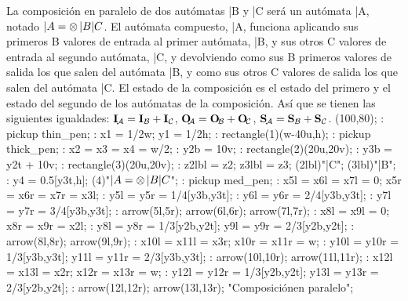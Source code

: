 La composición en paralelo de dos autómatas |B y |C será un
autómata |A, notado $|A = \prl |B |C$.  El autómata compuesto, |A,
funciona aplicando sus primeros \inp B valores de entrada al primer
autómata, |B, y sus otros \inp C valores de entrada al segundo
autómata, |C, y devolviendo como sus \out B primeros valores de salida
los que salen del autómata |B, y como sus otros \out C valores de salida
los que salen del autómata |C.  El estado de la composición es el
estado del primero y el estado del segundo de los autómatas de la
composición.  Así que se tienen las siguientes igualdades:
 $\inpA = \inp B + \inp C$, $\outA = \out B + \out C$,
 $\stA = \st B + \st C$.
\MTbeginfigure(100,80);
 \MT: pickup thin_pen;
 \MT: x1 = 1/2w; y1 = 1/2h;
 \MT: rectangle(1)(w-40u,h); %
 \MT: pickup thick_pen;
 \MT: x2 = x3 = x4 = w/2;
 \MT: y2b = 10v;
 \MT: rectangle(2)(20u,20v); %
 \MT: y3b = y2t + 10v;
 \MT: rectangle(3)(20u,20v); %
 \MT: z2lbl = z2; z3lbl = z3;
 \MTlabel(2lbl)"|C";
 \MTlabel(3lbl)"|B";
 \MT: y4 = 0.5[y3t,h];
 \MTlabel(4)"$|A = \prl |B |C$"; %
 \MT: pickup med_pen;
 \MT: x5l = x6l = x7l = 0; x5r = x6r = x7r = x3l;
 \MT: y5l = y5r = 1/4[y3b,y3t];
 \MT: y6l = y6r = 2/4[y3b,y3t];
 \MT: y7l = y7r = 3/4[y3b,y3t];
 \MT: arrow(5l,5r); arrow(6l,6r); arrow(7l,7r); %
 \MT: x8l = x9l = 0; x8r = x9r = x2l;
 \MT: y8l = y8r = 1/3[y2b,y2t]; y9l = y9r = 2/3[y2b,y2t];
 \MT: arrow(8l,8r); arrow(9l,9r); %
 \MT: x10l = x11l = x3r; x10r = x11r = w;
 \MT: y10l = y10r = 1/3[y3b,y3t]; y11l = y11r = 2/3[y3b,y3t];
 \MT: arrow(10l,10r); arrow(11l,11r); %
 \MT: x12l = x13l = x2r; x12r = x13r = w;
 \MT: y12l = y12r = 1/3[y2b,y2t]; y13l = y13r = 2/3[y2b,y2t];
 \MT: arrow(12l,12r); arrow(13l,13r); %
\MTendfigure"Composición\cr en paralelo";


